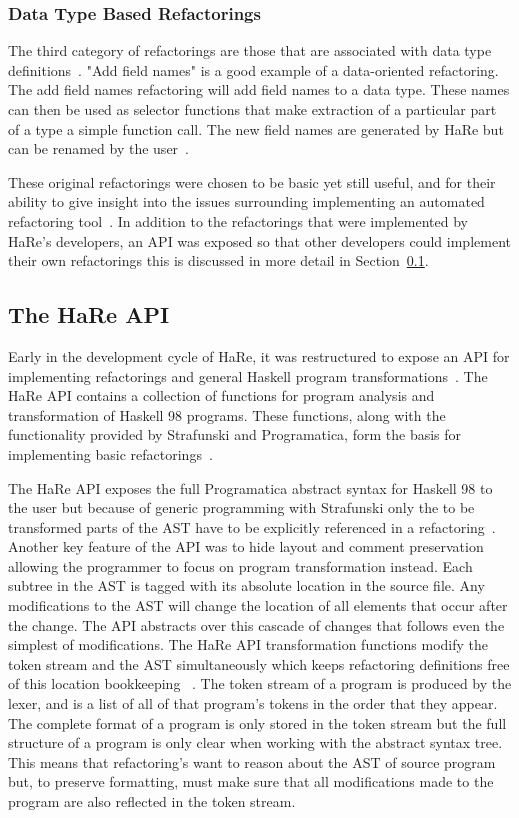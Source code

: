 \subsubsection{Data Type Based Refactorings}

The third category of refactorings are those that are associated with data type definitions~\citep[p. 21]{huiqingThesis}. "Add field names" is a good example of a data-oriented refactoring.  The add field names refactoring will add field names to a data type. These names can then be used as selector functions that make extraction of a particular part of a type a simple function call. The new field names are generated by HaRe but can be renamed by the user~\citep{huiqingThesis}.

These original refactorings were chosen to be basic yet still useful, and for their ability to give insight into the issues surrounding implementing an automated refactoring tool~\citep{huiqingThesis}. In addition to the refactorings that were implemented by HaRe's developers, an API was exposed so that other developers could implement their own refactorings this is discussed in more detail in Section~\ref{hareApi}.


\subsection{The HaRe API}\label{hareApi}

Early in the development cycle of HaRe, it was restructured to expose an API for implementing refactorings and general Haskell program transformations~\citep{hareApi}. The HaRe API contains a collection of functions for program analysis and transformation of Haskell 98 programs. These functions, along with the functionality provided by Strafunski and Programatica, form the basis for implementing basic refactorings~\citep{hareApi}.

The HaRe API exposes the full Programatica abstract syntax for Haskell 98 to the user but because of generic programming with Strafunski only the to be transformed parts of the AST have to be explicitly referenced in a refactoring~\citep{hareApi}. Another key feature of the API was to hide layout and comment preservation allowing the programmer to focus on program transformation instead. Each subtree in the AST is tagged with its absolute location in the source file. Any modifications to the AST will change the location of all elements that occur after the change. The API abstracts over this cascade of changes that follows even the simplest of modifications. The HaRe API transformation functions modify the token stream and the AST simultaneously which keeps refactoring definitions free of this location bookkeeping ~\citep{hareApi}. The token stream of a program is produced by the lexer, and is a list of all of that program's tokens in the order that they appear. The complete format of a program is only stored in the token stream but the full structure of a program is only clear when working with the abstract syntax tree. This means that refactoring's want to reason about the AST of source program but, to preserve formatting, must make sure that all modifications made to the program are also reflected in the token stream.

